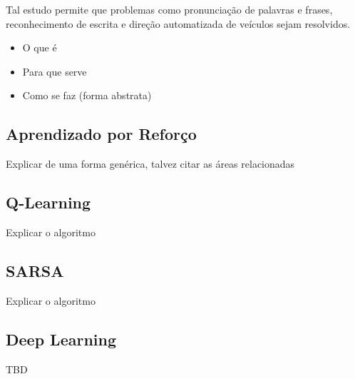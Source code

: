 Tal estudo permite que problemas como pronunciação de palavras e frases,
reconhecimento de escrita e direção automatizada de veículos
\cite{Russell:1995:AIM:193191} sejam resolvidos.

\begin{itemize} \item O que é \item Para que serve \item Como se faz (forma
abstrata) \end{itemize}

\subsection{Aprendizado por Reforço}

Explicar de uma forma genérica, talvez citar as áreas relacionadas

\subsection{Q-Learning}

Explicar o algoritmo

\subsection{SARSA}

Explicar o algoritmo

\subsection{Deep Learning}

TBD
